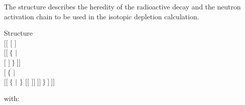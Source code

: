 The structure  describes the heredity of the radioactive decay
and the neutron activation chain to be used in the isotopic depletion
calculation.
\begin{DataStructure}{Structure }
 \\
$[[$  $[$  $]$ \\
\hskip 1.0cm $[[~\{$   $|$ \\
\hskip 2.0cm  $[$  $]~\}~]]$ \\
\hskip 1.0cm $[~\{$  $|$ \\
\hskip 2.0cm  $[[~\{$  $|$  $\}$
$[[$   $]]~]]~\}~]~]]$\\
\end{DataStructure}

\vspace{-0.15cm}

\noindent
with:

